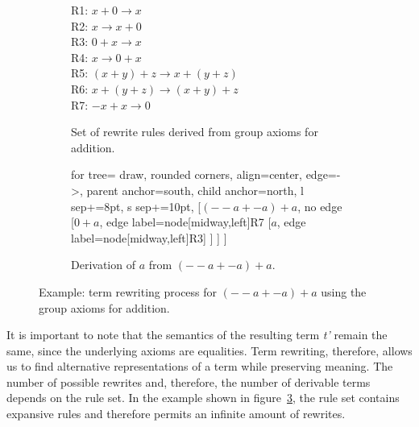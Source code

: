 \begin{figure}[h]
	\centering
	\begin{subfigure}[c]{0.55\textwidth}
		\vspace*{\fill} %
		\raggedright
		R1: $x + 0 \rightarrow x$\\
		R2: $x \rightarrow x + 0$\\
		R3: $0 + x \rightarrow x$\\
		R4: $x \rightarrow 0 + x$\\
		R5: $(x + y) + z \rightarrow x + (y + z)$\\
		R6: $x + (y + z) \rightarrow (x + y) + z$\\
		R7: $-x + x \rightarrow 0$
		\vspace*{\fill}
		\caption{\scriptsize Set of rewrite rules derived from group axioms for addition.}
		\label{fig:term-rewriting-rules}
	\end{subfigure}
	\hfill
	\begin{subfigure}[c]{0.4\textwidth}
		\centering
		\begin{forest}
			for tree={
				draw,
				rounded corners,
				align=center,
				edge={->},
				parent anchor=south,
				child anchor=north,
				l sep+=8pt,
				s sep+=10pt,
			}
			[$(--a + -a) + a$, no edge
			[$0 + a$, edge label={node[midway,left]{R7}}
			[$a$, edge label={node[midway,left]{R3}}]
			]
			]
			]
		\end{forest}
		\caption{\scriptsize Derivation of $a$ from $(--a + -a) + a$.}
		\label{fig:term-rewriting-tree}
	\end{subfigure}
	
	\caption{Example: term rewriting process for $(--a + -a) + a$ using the group axioms for addition.}
	\label{fig:term-rewriting-example}
\end{figure}



It is important to note that the semantics of the resulting term \emph{t'} remain the same, since the underlying axioms are equalities. Term rewriting, therefore, allows us to find alternative representations of a term while preserving meaning. The number of possible rewrites and, therefore, the number of derivable terms depends on the rule set. In the example shown in figure~\ref{fig:term-rewriting-example}, the rule set contains expansive rules and therefore permits an infinite amount of rewrites.

